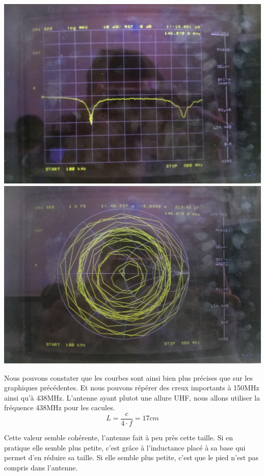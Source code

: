 \documentclass[a4paper,12pt]{report}            %
\begin{document}
\begin{center}
	\includegraphics[scale = 0.072]{pic/S_petite.jpg}
	\includegraphics[scale = 0.06]{pic/Smith_petite.jpg} 
\end{center}

Nous pouvons constater que les courbes sont ainsi bien plus précises que sur les graphiques précédentes.
Et nous pouvons répérer des creux importants à 150MHz ainsi qu'à 438MHz. L'antenne ayant plutot une allure 
UHF, nous allons utiliser la fréquence 438MHz pour les cacules. 
$$ L = \frac{c}{4\cdot f} = 17cm$$

Cette valeur semble cohérente, l'antenne fait à peu près cette taille. Si en pratique elle semble 
plus petite, c'est grâce à l'inductance placé à sa base qui permet d'en réduire sa taille. Si elle 
semble plus petite, c'est que le pied n'est pas compris dans l'antenne.
\end{document}

